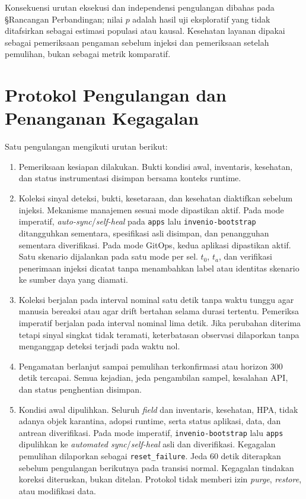 Konsekuensi urutan eksekusi dan independensi pengulangan dibahas pada §Rancangan Perbandingan; nilai $p$ adalah hasil uji eksploratif yang tidak ditafsirkan sebagai estimasi populasi atau kausal. Kesehatan layanan dipakai sebagai pemeriksaan pengaman sebelum injeksi dan pemeriksaan setelah pemulihan, bukan sebagai metrik komparatif.

\section{Protokol Pengulangan dan Penanganan Kegagalan}

Satu pengulangan mengikuti urutan berikut:
\begin{enumerate}
  \item Pemeriksaan kesiapan dilakukan. Bukti kondisi awal, inventaris, kesehatan, dan status instrumentasi disimpan bersama konteks runtime.
  \item Koleksi sinyal deteksi, bukti, kesetaraan, dan kesehatan diaktifkan sebelum injeksi. Mekanisme manajemen sesuai mode dipastikan aktif. Pada mode imperatif, \textit{auto-sync}/\textit{self-heal} pada \texttt{apps} lalu \texttt{invenio-bootstrap} ditangguhkan sementara, spesifikasi asli disimpan, dan penangguhan sementara diverifikasi. Pada mode GitOps, kedua aplikasi dipastikan aktif. Satu skenario dijalankan pada satu mode per sel. $t_0$, $t_a$, dan verifikasi penerimaan injeksi dicatat tanpa menambahkan label atau identitas skenario ke sumber daya yang diamati.
  \item Koleksi berjalan pada interval nominal satu detik tanpa waktu tunggu agar manusia bereaksi atau agar drift bertahan selama durasi tertentu. Pemeriksa imperatif berjalan pada interval nominal lima detik. Jika perubahan diterima tetapi sinyal singkat tidak teramati, keterbatasan observasi dilaporkan tanpa menganggap deteksi terjadi pada waktu nol.
  \item Pengamatan berlanjut sampai pemulihan terkonfirmasi atau horizon 300 detik tercapai. Semua kejadian, jeda pengambilan sampel, kesalahan API, dan status penghentian disimpan.
  \item Kondisi awal dipulihkan. Seluruh \textit{field} dan inventaris, kesehatan, HPA, tidak adanya objek karantina, adopsi runtime, serta status aplikasi, data, dan antrean diverifikasi. Pada mode imperatif, \texttt{invenio-bootstrap} lalu \texttt{apps} dipulihkan ke \textit{automated sync}/\textit{self-heal} asli dan diverifikasi. Kegagalan pemulihan dilaporkan sebagai \texttt{reset\_failure}. Jeda 60 detik diterapkan sebelum pengulangan berikutnya pada transisi normal. Kegagalan tindakan koreksi diteruskan, bukan ditelan. Protokol tidak memberi izin \textit{purge}, \textit{restore}, atau modifikasi data.
\end{enumerate}

